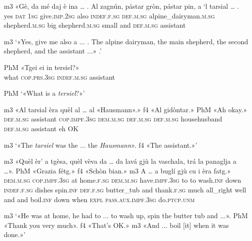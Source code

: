 \begin{linenumbers}
	\gll {\ob}m3{\cb} «Gè, da mé daj è ina … . Al zagnún, pástar gròn, pástar pin, a `l tarsial … . \\
	{} yes \textsc{dat} \textsc{1sg} give.\textsc{imp.2sg} also \textsc{indef.f.sg} {} {} \textsc{def.m.sg} alpine\_dairyman.\textsc{m.sg} shepherd.\textsc{m.sg} big shepherd.\textsc{m.sg} small and \textsc{def.m.sg} assistant\\
\end{linenumbers}
\medskip
\glt {\ob}m3{\cb} `«Yes, give me also a ... . The alpine dairyman, the main shepherd, the second shepherd, and the assistant ...» .'
\medskip

\begin{linenumbers}
	\gll {\ob}PhM{\cb} «Tgei ei in tersiel?»\\
{} what \textsc{cop.prs.3sg} \textsc{indef.m.sg} assistant	\\
\end{linenumbers}
\medskip
\glt {\ob}PhM{\cb} `«What is a \textit{tersiel}?»'
\medskip

\begin{linenumbers}
\gll {\ob}m3{\cb} «Al tarsial èra quèl al … al «Hausmann».»\footnotemark{} {\ob}f4{\cb} «Al gidòntar.» {\ob}PhM{\cb} «Ah okay.»\\
{}	\textsc{def.m.sg} assistant \textsc{cop.impf.3sg} \textsc{dem.m.sg} \textsc{def.m.sg} {} \textsc{def.m.sg} househusband {} \textsc{def.m.sg} assistant {} eh OK\\
\end{linenumbers}
\medskip
\glt {\ob}m3{\cb} `«The \textit{tarsiel} was the ... the \textit{Hausmann}». {\ob}f4{\cb} «The assistant.»'
\medskip

\begin{linenumbers}
	\gll  {\ob}m3{\cb} «Quèl èr’ a tgèsa, quèl vèva da … da lavá gjù la vaschala, trá la panaglja a …». {\ob}PhM{\cb} «Grazia fétg.» {\ob}f4{\cb} «Schòn bian.» {\ob}m3{\cb} A … a buglí gjù cu i èra fatg.»\\
{}	\textsc{dem.m.sg} \textsc{cop.impf.3sg} at home.\textsc{f.sg} \textsc{dem.m.sg} have.\textsc{impf.3sg} to {} to  wash.\textsc{inf} down \textsc{indef.f.sg} dishes spin.\textsc{inf} \textsc{def.f.sg} butter\_tub and {} {} thank.\textsc{f.sg} much {} all\_right well {} and {}  and boil.\textsc{inf} down when \textsc{expl} \textsc{pass.aux.impf.3sg} do.\textsc{ptcp.unm}\\
\end{linenumbers}
\medskip
\glt {\ob}m3{\cb} `«He was at home, he had to ... to wash up, spin the butter tub and ...». {\ob}PhM{\cb} «Thank you very much». {\ob}f4{\cb} «That's OK.» {\ob}m3{\cb} «And ...  boil [it] when it was done.»'
\medskip

